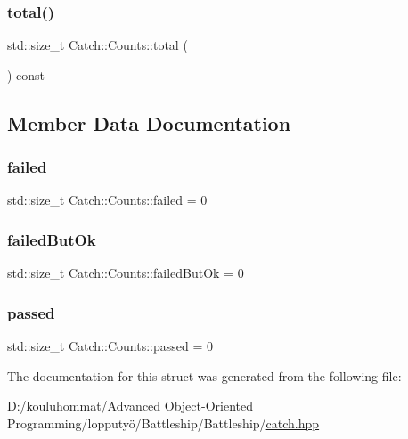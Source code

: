 \mbox{\label{struct_catch_1_1_counts_a94f969c09cf52d1339c085c9603cd1d3}} 
\subsubsection{\texorpdfstring{total()}{total()}}
{\footnotesize\ttfamily std\+::size\+\_\+t Catch\+::\+Counts\+::total (\begin{DoxyParamCaption}{ }\end{DoxyParamCaption}) const}



\subsection{Member Data Documentation}
\mbox{\label{struct_catch_1_1_counts_a19982a3817a3bc2c07f0290e71f497a3}} 
\subsubsection{\texorpdfstring{failed}{failed}}
{\footnotesize\ttfamily std\+::size\+\_\+t Catch\+::\+Counts\+::failed = 0}

\mbox{\label{struct_catch_1_1_counts_ac090973a2ff51394cd452718e75c073e}} 
\subsubsection{\texorpdfstring{failed\+But\+Ok}{failedButOk}}
{\footnotesize\ttfamily std\+::size\+\_\+t Catch\+::\+Counts\+::failed\+But\+Ok = 0}

\mbox{\label{struct_catch_1_1_counts_ad28daaf3de28006400208b6dd0c631e6}} 
\subsubsection{\texorpdfstring{passed}{passed}}
{\footnotesize\ttfamily std\+::size\+\_\+t Catch\+::\+Counts\+::passed = 0}



The documentation for this struct was generated from the following file\+:\begin{DoxyCompactItemize}
\item 
D\+:/kouluhommat/\+Advanced Object-\/\+Oriented Programming/lopputyö/\+Battleship/\+Battleship/\mbox{\hyperlink{catch_8hpp}{catch.\+hpp}}\end{DoxyCompactItemize}
